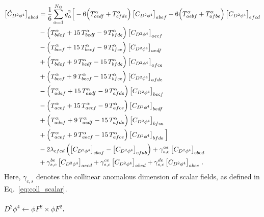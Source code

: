 \begin{align}
\left[\dot{C}_{D^2\phi^4}\right]_{abcd} &=
\frac{1}{6}\sum_{\alpha=1}^{N_G} g_{\alpha}^2 \Big[
-6\Bigl( T^\alpha_{cedf} + T^\alpha_{cfde} \Bigr)
\left[C_{D^2\phi^4}\right]_{abef} -6\Bigl( T^\alpha_{aebf} + T^\alpha_{afbe} \Bigr)
\left[C_{D^2\phi^4}\right]_{efcd}\nonumber \\
&-\Bigl( T^\alpha_{bdef} + 15\,T^\alpha_{bedf} - 9\,T^\alpha_{bfde} \Bigr)
\left[C_{D^2\phi^4}\right]_{aecf} \nonumber\\
&-\Bigl( T^\alpha_{bcef} + 15\,T^\alpha_{becf} - 9\,T^\alpha_{bfce} \Bigr)
\left[C_{D^2\phi^4}\right]_{aedf} \nonumber\\
&+\Bigl( T^\alpha_{bdef} + 9\,T^\alpha_{bedf} - 15\,T^\alpha_{bfde} \Bigr)
\left[C_{D^2\phi^4}\right]_{afce} \nonumber\\
&+\Bigl( T^\alpha_{bcef} + 9\,T^\alpha_{becf} - 15\,T^\alpha_{bfce} \Bigr)
\left[C_{D^2\phi^4}\right]_{afde} \nonumber\\
&-\Bigl( T^\alpha_{adef} + 15\,T^\alpha_{aedf} - 9\,T^\alpha_{afde} \Bigr)
\left[C_{D^2\phi^4}\right]_{becf} \nonumber\\
&-\Bigl( T^\alpha_{acef} + 15\,T^\alpha_{aecf} - 9\,T^\alpha_{afce} \Bigr)
\left[C_{D^2\phi^4}\right]_{bedf}\nonumber \\
&+\Bigl( T^\alpha_{adef} + 9\,T^\alpha_{aedf} - 15\,T^\alpha_{afde} \Bigr)
\left[C_{D^2\phi^4}\right]_{bfce}\nonumber \\
&+\Bigl( T^\alpha_{acef} + 9\,T^\alpha_{aecf} - 15\,T^\alpha_{afce} \Bigr)
\left[C_{D^2\phi^4}\right]_{bfde} 
\Big]\nonumber \\
&-2\lambda_{efcd}\left(\left[C_{D^2\phi^4}\right]_{ebaf}-\left[C_{D^2\phi^4}\right]_{efab}\right)+ \gamma_{s,c}^{ae}\left[C_{D^2\phi^4}\right]_{ebcd}\nonumber \\&
+
\gamma_{s,c}^{be}\left[C_{D^2\phi^4}\right]_{aecd}
+
\gamma_{s,c}^{ce}\left[C_{D^2\phi^4}\right]_{abed}
+
\gamma_{s,c}^{de}\left[C_{D^2\phi^4}\right]_{abce}\,.\label{eq:D2phi4<-D2phi4_offshell}
\end{align}
Here, $\gamma_{c,s}$ denotes the collinear anomalous dimension of scalar fields, as defined in Eq.~\eqref{eq:coll_scalar}.

\paragraph{\texorpdfstring{$D^2\phi^4\leftarrow \phi F^2\times \phi F^2$}{D2phi4fromphiF2xphiF2}.}
\label{par:D2phi4<-phiF2xphiF2}

